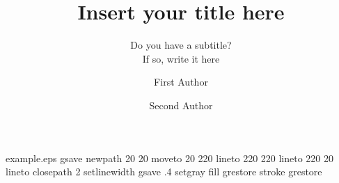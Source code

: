 %
%
%
%
%
\begin{filecontents*}{example.eps}
gsave
newpath
  20 20 moveto
  20 220 lineto
  220 220 lineto
  220 20 lineto
closepath
2 setlinewidth
gsave
  .4 setgray fill
grestore
stroke
grestore
\end{filecontents*}
%
\RequirePackage{fix-cm}

%
\documentclass[natbib,smallextended]{svjour3}   %
%
\smartqed  %
%
\usepackage{graphicx}

%
%
%
%
%


\title{Insert your title here%
}
\subtitle{Do you have a subtitle?\\ If so, write it here}


\author{First Author         \and
        Second Author %
}


